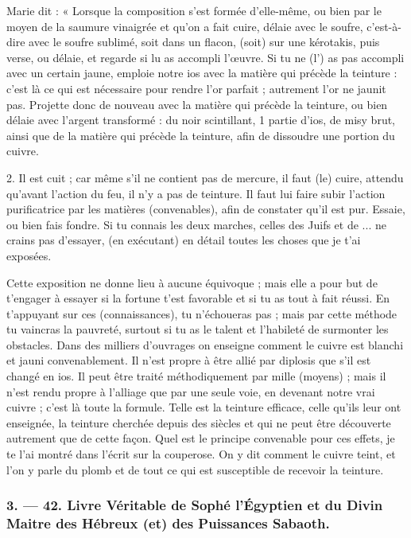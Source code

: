 \documentclass[landscape, a4paper, 11pt, oneside, polutonikogreek, french]{article}
\begin{document}
Marie dit : « Lorsque la composition s'est formée d'elle-même, ou bien par le moyen de la saumure vinaigrée et qu'on a fait cuire, délaie avec le soufre, c'est-à-dire avec le soufre sublimé, soit dans un flacon, (soit) sur une kérotakis, puis verse, ou délaie, et regarde si lu as accompli l'œuvre. Si tu ne (l') as pas accompli avec un certain jaune, emploie notre ios avec la matière qui précède la teinture : c'est là ce qui est nécessaire pour rendre l'or parfait ; autrement l'or ne jaunit pas. Projette donc de nouveau avec la matière qui précède la teinture, ou bien délaie avec l'argent transformé : du noir scintillant, 1 partie d'ios, de misy brut, ainsi que de la matière qui précède la teinture, afin de dissoudre une portion du cuivre.

2. Il est cuit ; car même s'il ne contient pas de mercure, il faut (le) cuire, attendu qu'avant l'action du feu, il n'y a pas de teinture. Il faut lui faire subir l'action purificatrice par les matières (convenables), afin de constater qu'il est pur. Essaie, ou bien fais fondre. Si tu connais les deux marches, celles des Juifs et de ... ne crains pas d'essayer, (en exécutant) en détail toutes les choses que je t'ai exposées.

Cette exposition ne donne lieu à aucune équivoque ; mais elle a pour but de t'engager à essayer si la fortune t'est favorable et si tu as tout à fait réussi. En t'appuyant sur ces (connaissances), tu n'échoueras pas ; mais par cette méthode tu vaincras la pauvreté, surtout si tu as le talent et l'habileté de surmonter les obstacles. Dans des milliers d'ouvrages on enseigne comment le cuivre est blanchi et jauni convenablement. Il n'est propre à être allié par diplosis que s'il est changé en ios. Il peut être traité méthodiquement par mille (moyens) ; mais il n'est rendu propre à l'alliage que par une seule voie, en devenant notre vrai cuivre ; c'est là toute la formule. Telle est la teinture efficace, celle qu'ils leur ont enseignée, la teinture cherchée depuis des siècles et qui ne peut être découverte autrement que de cette façon. Quel est le principe convenable pour ces effets, je te l'ai montré dans l'écrit sur la couperose. On y dit comment le cuivre teint, et l'on y parle du plomb et de tout ce qui est susceptible de recevoir la teinture.

\bigskip
\centerline{\EightStarTaper}
\centerline{\EightStarTaper\EightStarTaper}
\bigskip

\subsubsection{3. --- 42. Livre Véritable de Sophé l'Égyptien et du Divin Maitre des Hébreux (et) des Puissances Sabaoth.}
\end{document}
